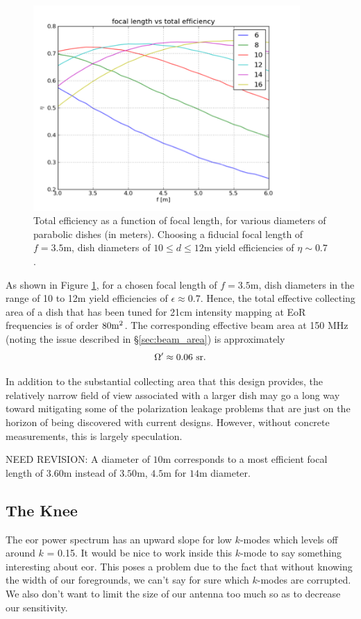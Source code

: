 \documentclass[11pt]{article}
\begin{document}
\begin{figure}
\centering
\includegraphics[width=4in]{dish_plots/focal_len_vs_eff.png}
\caption{Total efficiency as a function of focal length, for various diameters
of parabolic dishes (in meters).  Choosing a fiducial focal length of $f=3.5$m,
dish diameters of $10\le d\le 12$m yield efficiencies of $\eta\sim0.7$.}
\label{fig:focal_len_vs_eff}
\end{figure}

As shown in Figure \ref{fig:focal_len_vs_eff}, for a chosen focal length of
$f=3.5$m, dish diameters in the range of 10 to 12m yield efficiencies of
$\epsilon\approx0.7$.  Hence, the total effective collecting area of a dish that
has been tuned for 21cm intensity mapping at EoR frequencies is of order $80{\rm
m}^2$.  The corresponding effective beam area at 150 MHz 
(noting the issue described in \S\ref{sec:beam_area}) is approximately
\begin{equation}
\Omega^\prime\approx0.06\ {\rm sr}.
\end{equation}

In addition to the substantial collecting area that this design provides, the
relatively narrow field of view associated with a larger dish may go a long way
toward mitigating some of the polarization leakage problems that are just on the
horizon of being discovered with current designs.  However, without concrete
measurements, this is largely speculation.

NEED REVISION:
A diameter of $10$m corresponds to a most efficient focal length of $3.60$m instead of
$3.50$m, $4.5$m for $14$m diameter.

\subsection{The Knee}
The eor power spectrum has an upward slope for low $k$-modes which levels off
around $k$ = 0.15. It would be nice to work inside this $k$-mode to say
something interesting about eor. This poses a problem due to the fact that
without knowing the width of our foregrounds, we can't say for sure which
$k$-modes are corrupted. We also don't want to limit the size of our antenna too
much so as to decrease our sensitivity. 
\end{document}
